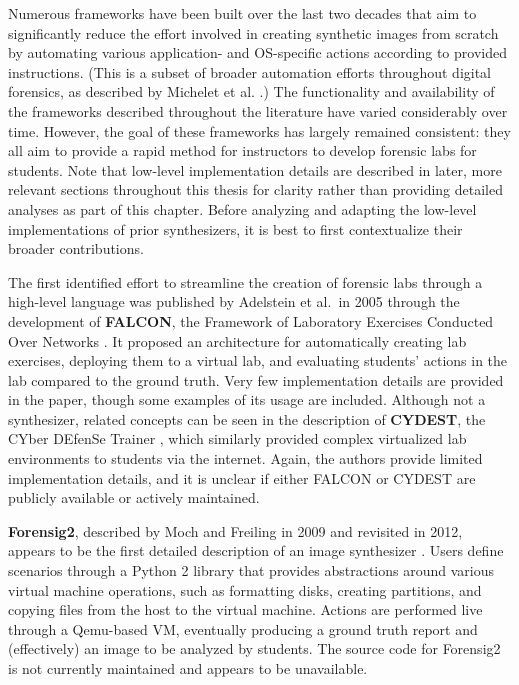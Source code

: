\documentclass[letterpaper,12pt]{report}
\begin{document}
Numerous frameworks have been built over the last two decades that aim
to significantly reduce the effort involved in creating synthetic images
from scratch by automating various application- and OS-specific actions
according to provided instructions. (This is a subset of broader
automation efforts throughout digital forensics, as described by
Michelet et al. \cite{micheletAutomationDigitalForensics2023}.) The
functionality and availability of the frameworks described throughout
the literature have varied considerably over time. However, the goal of
these frameworks has largely remained consistent: they all aim to
provide a rapid method for instructors to develop forensic labs for
students. Note that low-level implementation details are described in
later, more relevant sections throughout this thesis for clarity rather
than providing detailed analyses as part of this chapter. Before
analyzing and adapting the low-level implementations of prior
synthesizers, it is best to first contextualize their broader
contributions.

The first identified effort to streamline the creation of forensic labs
through a high-level language was published by Adelstein et al.~in 2005
through the development of \textbf{FALCON}, the Framework of Laboratory
Exercises Conducted Over Networks
\cite{adelsteinAutomaticallyCreatingRealistic2005}. It proposed an
architecture for automatically creating lab exercises, deploying them to
a virtual lab, and evaluating students' actions in the lab compared to
the ground truth. Very few implementation details are provided in the
paper, though some examples of its usage are included. Although not a
synthesizer, related concepts can be seen in the description of
\textbf{CYDEST}, the CYber DEfenSe Trainer
\cite{bruecknerAutomatedComputerForensics2008}, which similarly
provided complex virtualized lab environments to students via the
internet. Again, the authors provide limited implementation details, and
it is unclear if either FALCON or CYDEST are publicly available or
actively maintained.

\textbf{Forensig2}, described by Moch and Freiling in 2009 and revisited
in 2012, appears to be the first detailed description of an image
synthesizer
\cite{mochForensicImageGenerator2009,mochEvaluatingForensicImage2012}.
Users define scenarios through a Python 2 library that provides
abstractions around various virtual machine operations, such as
formatting disks, creating partitions, and copying files from the host
to the virtual machine. Actions are performed live through a Qemu-based
VM, eventually producing a ground truth report and (effectively) an
image to be analyzed by students. The source code for Forensig2 is not
currently maintained and appears to be unavailable.
\end{document}
